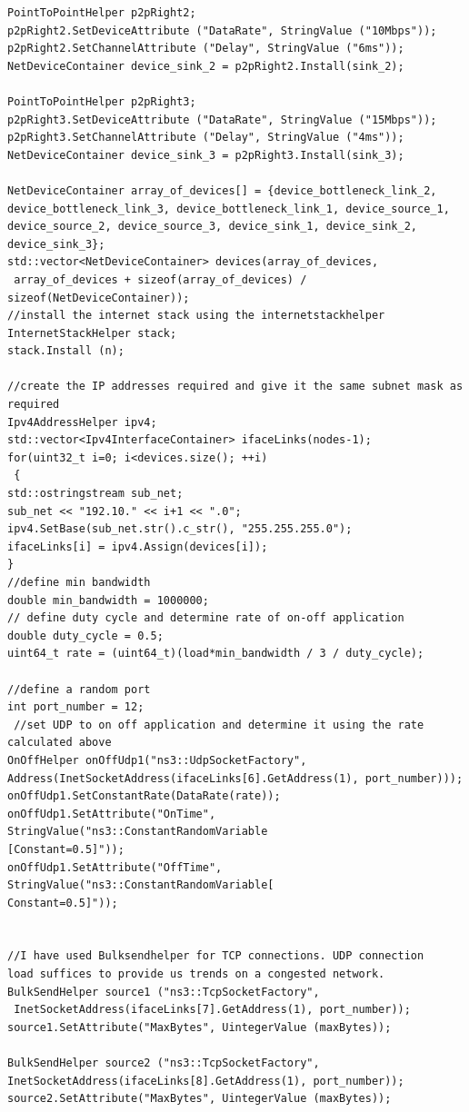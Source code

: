 \documentclass[paper=a4, fontsize=12pt]{scrartcl} %
\numberwithin{equation}{section} %
\numberwithin{figure}{section} %
\numberwithin{table}{section} %
\begin{document}
\begin{lstlisting}
PointToPointHelper p2pRight2;
p2pRight2.SetDeviceAttribute ("DataRate", StringValue ("10Mbps"));
p2pRight2.SetChannelAttribute ("Delay", StringValue ("6ms"));
NetDeviceContainer device_sink_2 = p2pRight2.Install(sink_2);

PointToPointHelper p2pRight3;
p2pRight3.SetDeviceAttribute ("DataRate", StringValue ("15Mbps"));
p2pRight3.SetChannelAttribute ("Delay", StringValue ("4ms"));
NetDeviceContainer device_sink_3 = p2pRight3.Install(sink_3);

NetDeviceContainer array_of_devices[] = {device_bottleneck_link_2, 
device_bottleneck_link_3, device_bottleneck_link_1, device_source_1, 
device_source_2, device_source_3, device_sink_1, device_sink_2, device_sink_3};
std::vector<NetDeviceContainer> devices(array_of_devices,
 array_of_devices + sizeof(array_of_devices) / sizeof(NetDeviceContainer));
//install the internet stack using the internetstackhelper
InternetStackHelper stack;
stack.Install (n);

//create the IP addresses required and give it the same subnet mask as required
Ipv4AddressHelper ipv4;
std::vector<Ipv4InterfaceContainer> ifaceLinks(nodes-1);
for(uint32_t i=0; i<devices.size(); ++i)
 {
std::ostringstream sub_net;
sub_net << "192.10." << i+1 << ".0";
ipv4.SetBase(sub_net.str().c_str(), "255.255.255.0");
ifaceLinks[i] = ipv4.Assign(devices[i]);
}
//define min bandwidth
double min_bandwidth = 1000000;
// define duty cycle and determine rate of on-off application
double duty_cycle = 0.5;
uint64_t rate = (uint64_t)(load*min_bandwidth / 3 / duty_cycle); 

//define a random port
int port_number = 12;
 //set UDP to on off application and determine it using the rate calculated above
OnOffHelper onOffUdp1("ns3::UdpSocketFactory", 
Address(InetSocketAddress(ifaceLinks[6].GetAddress(1), port_number)));
onOffUdp1.SetConstantRate(DataRate(rate));
onOffUdp1.SetAttribute("OnTime", StringValue("ns3::ConstantRandomVariable
[Constant=0.5]"));
onOffUdp1.SetAttribute("OffTime", StringValue("ns3::ConstantRandomVariable[
Constant=0.5]"));


//I have used Bulksendhelper for TCP connections. UDP connection 
load suffices to provide us trends on a congested network.
BulkSendHelper source1 ("ns3::TcpSocketFactory",
 InetSocketAddress(ifaceLinks[7].GetAddress(1), port_number));
source1.SetAttribute("MaxBytes", UintegerValue (maxBytes));

BulkSendHelper source2 ("ns3::TcpSocketFactory", 
InetSocketAddress(ifaceLinks[8].GetAddress(1), port_number));
source2.SetAttribute("MaxBytes", UintegerValue (maxBytes));


\end{lstlisting}
\end{document}
